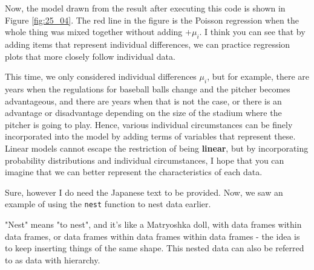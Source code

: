 \documentclass{ltjsbook}
\begin{document}





Now, the model drawn from the result after executing this code is shown in Figure \ref{fig:25_04}. The red line in the figure is the Poisson regression when the whole thing was mixed together without adding $+\mu_i$. I think you can see that by adding items that represent individual differences, we can practice regression plots that more closely follow individual data.


This time, we only considered individual differences $\mu_i$, but for example, there are years when the regulations for baseball balls change and the pitcher becomes advantageous, and there are years when that is not the case, or there is an advantage or disadvantage depending on the size of the stadium where the pitcher is going to play. Hence, various individual circumstances can be finely incorporated into the model by adding terms of variables that represent these. Linear models cannot escape the restriction of being \textbf{linear}, but by incorporating probability distributions and individual circumstances, I hope that you can imagine that we can better represent the characteristics of each data.

Sure, however I do need the Japanese text to be provided.
Now, we saw an example of using the \verb|nest| function to nest data earlier.

"Nest" means "to nest", and it's like a Matryoshka doll, with data frames within data frames, or data frames within data frames within data frames - the idea is to keep inserting things of the same shape.
This nested data can also be referred to as data with hierarchy.
\end{document}
